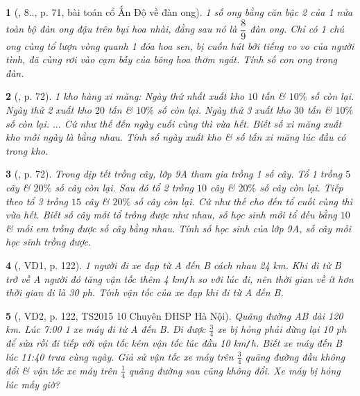 \documentclass{article}
\newtheorem{baitoan}{}
\begin{document}
\begin{baitoan}[\cite{Binh_boi_duong_Toan_9_tap_2}, 8.., p. 71, bài toán cổ Ấn Độ về đàn ong]
	1 số ong bằng căn bậc 2 của 1 nửa toàn bộ đàn ong đậu trên bụi hoa nhài, đằng sau nó là $\dfrac{8}{9}$ đàn ong. Chỉ có 1 chú ong cùng tổ lượn vòng quanh 1 đóa hoa sen, bị cuốn hút bởi tiếng vo vo của người tình, đã cùng rơi vào cạm bẫy của bông hoa thơm ngát. Tính số con ong trong đàn.
\end{baitoan}

\begin{baitoan}[\cite{Binh_boi_duong_Toan_9_tap_2}, p. 72]
	1 kho hàng xi măng: Ngày thứ nhất xuất kho $10$ tấn \& $10\%$ số còn lại. Ngày thứ 2 xuất kho $20$ tấn \& $10\%$ số còn lại. Ngày thứ 3 xuất kho $30$ tấn \& $10\%$ số còn lại. $\ldots$ Cứ như thế đến ngày cuối cùng thì vừa hết. Biết số xi măng xuất kho mỗi ngày là bằng nhau. Tính số ngày xuất kho \& số tấn xi măng lúc đầu có trong kho.
\end{baitoan}

\begin{baitoan}[\cite{Binh_boi_duong_Toan_9_tap_2}, p. 72]
	Trong dịp tết trồng cây, lớp 9A tham gia trồng 1 số cây. Tổ 1 trồng $5$ cây \& $20\%$ số cây còn lại. Sau đó tổ 2 trồng $10$ cây \& $20\%$ số cây còn lại. Tiếp theo tổ 3 trồng $15$ cây \& $20\%$ số cây còn lại. Cứ như thế cho đến tổ cuối cùng thì vừa hết. Biết số cây mỗi tổ trồng được như nhau, số học sinh mỗi tổ đều bằng $10$ \& mỗi em trồng được số cây bằng nhau. Tính số học sinh của lớp 9A, số cây mỗi học sinh trồng được.
\end{baitoan}

\begin{baitoan}[\cite{Kien_dai_so_9}, VD1, p. 122]
	1 người đi xe đạp từ A đến B cách nhau {\rm24 km}. Khi đi từ B trở về A người đó tăng vận tốc thêm {\rm4 km{\tt/}h} so với lúc đi, nên thời gian về ít hơn thời gian đi là {\rm30 ph}. Tính vận tốc của xe đạp khi đi từ A đến B.
\end{baitoan}

\begin{baitoan}[\cite{Kien_dai_so_9}, VD2, p. 122, TS2015 10 Chuyên ĐHSP Hà Nội]
	Quãng đường AB dài {\rm120 km}. Lúc {\rm7:00} 1 xe máy đi từ A đến B. Đi được $\frac{3}{4}$ xe bị hỏng phải dừng lại {\rm10 ph} để sửa rồi đi tiếp với vận tốc kém vận tốc lúc đầu {\rm10 km{\tt/}h}. Biết xe máy đến B lúc {\rm11:40} trưa cùng ngày. Giả sử vận tốc xe máy trên $\frac{3}{4}$ quãng đường đầu không đổi \& vận tốc xe máy trên $\frac{1}{4}$ quãng đường sau cũng không đổi. Xe máy bị hỏng lúc mấy giờ?
\end{baitoan}
\end{document}
